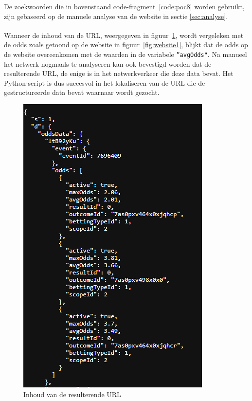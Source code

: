De zoekwoorden die in bovenstaand code-fragment~\ref{code:poc8} worden gebruikt, zijn gebaseerd op de manuele analyse van de website in sectie \ref{sec:analyse}.
\\ \\
Wanneer de inhoud van de URL, weergegeven in figuur~\ref{fig:resultaat}, wordt vergeleken met de odds zoals getoond op de website in figuur~\ref{fig:website1}, blijkt dat de odds op de website overeenkomen met de waarden in de variabele \texttt{''avgOdds"}. Na manueel het netwerk nogmaals te analyseren kan ook bevestigd worden dat de resulterende URL, de enige is in het netwerkverkeer die deze data bevat. Het Python-script is dus succesvol in het lokaliseren van de URL die de gestructureerde data bevat waarnaar wordt gezocht.
\begin{figure}[h]
    \centering
    \includegraphics{graphics/res_json.png}
    \caption{Inhoud van de resulterende URL}
    \label{fig:resultaat}
\end{figure}




